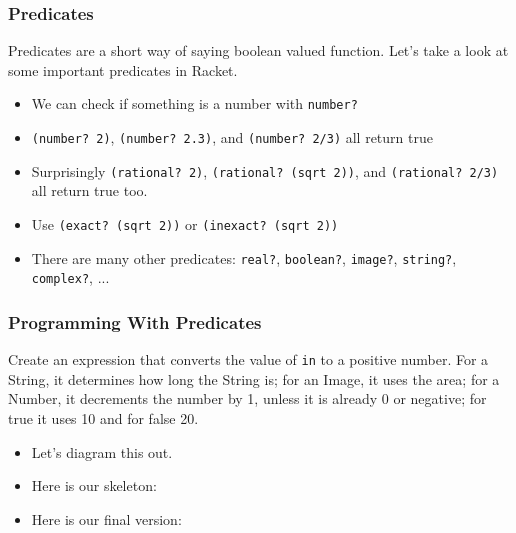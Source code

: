 \documentclass{beamer}
\begin{document}
\begin{frame}
  \frametitle{Predicates}
  Predicates are a short way of saying boolean valued function. Let's take
  a look at some important predicates in Racket.
  \begin{itemize}
  \item<2-> We can check if something is a number with \texttt{number?}
  \item<3-> \texttt{(number? 2)}, \texttt{(number? 2.3)}, and \texttt{(number? 2/3)} all return true
  \item<4-> Surprisingly \texttt{(rational? 2)}, \texttt{(rational? (sqrt 2))}, and \texttt{(rational? 2/3)} all return true too. 
  \item<5-> Use \texttt{(exact? (sqrt 2))} or \texttt{(inexact? (sqrt 2))}
  \item<6-> There are many other predicates: \texttt{real?},
    \texttt{boolean?}, \texttt{image?},
    \texttt{string?}, \texttt{complex?}, ...
  \end{itemize}
\end{frame}


\begin{frame}
  \frametitle{Programming With Predicates}
  Create an expression that converts the value of \texttt{in} to a positive number. For a String, it determines how long the String is; for an Image, it uses the area; for a Number, it decrements the number by 1, unless it is already 0 or negative; for true it uses 10 and for false 20.
\begin{itemize}
\item<2-> Let's diagram this out.
\item<3-> Here is our skeleton: \predicateSkeleton
\item<4-> Here is our final version: \predicateFinal
\end{itemize}

\end{frame}
\end{document}

